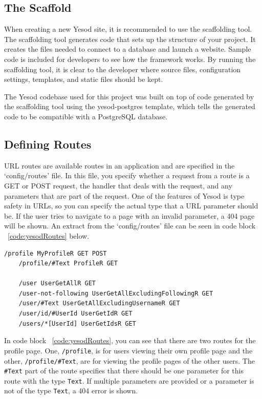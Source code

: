 \subsection{The Scaffold}
When creating a new Yesod site, it is recommended to use the scaffolding tool.
The scaffolding tool generates code that sets up the structure of your project. It
creates the files needed to connect to a database and launch a website. Sample code
is included for developers to see how the framework works. By running the scaffolding
tool, it is clear to the developer where source files, configuration settings, templates, and 
static files should be kept. \parencite[Scaffolding and the Site Template]{yesodBook}

The Yesod codebase used for this project was built on top of code generated by the
scaffolding tool using the yesod-postgres template, which tells the generated code
to be compatible with a PostgreSQL database.

\subsection{Defining Routes}

URL routes are available routes in an application and are specified in the 
`config/routes' file. In this file, you specify whether a request from a route is a
GET or POST request, the handler that deals with the request, and any parameters
that are part of the request. One of the features of Yesod is type safety in URLs,
so you can specify the actual type that a URL parameter should be. If the user
tries to navigate to a page with an invalid parameter, a 404 page will be shown.
An extract from the `config/routes' file can be seen in code block 
~\ref{code:yesodRoutes} below.


\begin{lstlisting}[caption={Yesod URL routes},label={code:yesodRoutes}]
    /profile MyProfileR GET POST
    /profile/#Text ProfileR GET
    
    /user UserGetAllR GET
    /user-not-following UserGetAllExcludingFollowingR GET
    /user/#Text UserGetAllExcludingUsernameR GET
    /user/id/#UserId UserGetIdR GET
    /users/*[UserId] UserGetIdsR GET
\end{lstlisting}

In code block ~\ref{code:yesodRoutes}, you can see that there
are two routes for the profile page. One, \texttt{/profile}, is for users
viewing their own profile page and the other, \texttt{/profile/\#Text}, are
for viewing the profile pages of the other users. The \texttt{\#Text} part
of the route specifies that there should be one parameter for this
route with the type \texttt{Text}. If multiple parameters are provided or a parameter
is not of the type \texttt{Text}, a 404 error is shown.

